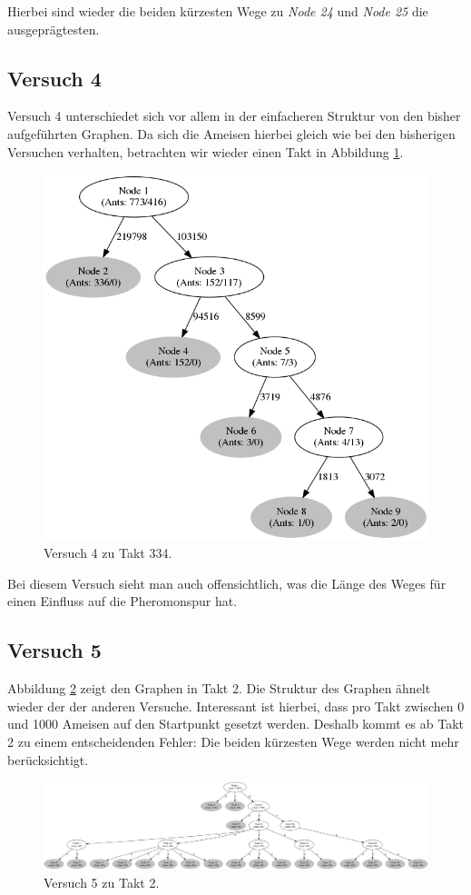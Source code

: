 Hierbei sind wieder die beiden kürzesten Wege zu \emph{Node 24} und \emph{Node 25} die ausgeprägtesten.


\subsection{Versuch 4}
Versuch 4 unterschiedet sich vor allem in der einfacheren Struktur von den bisher aufgeführten Graphen. Da sich die Ameisen hierbei gleich wie bei den bisherigen Versuchen verhalten, betrachten wir wieder einen Takt in Abbildung \ref{fig:v4_334}.

\begin{figure}[htbp]
	\includegraphics[width=.5\textwidth]{images/v4_334.png}
	\caption{Versuch 4 zu Takt 334.}
	\label{fig:v4_334}
\end{figure}

Bei diesem Versuch sieht man auch offensichtlich, was die Länge des Weges für einen Einfluss auf die Pheromonspur hat.

\subsection{Versuch 5}
Abbildung \ref{fig:v5_2} zeigt den Graphen in Takt 2. Die Struktur des Graphen ähnelt wieder der der anderen Versuche.
Interessant ist hierbei, dass pro Takt zwischen 0 und 1000 Ameisen auf den Startpunkt gesetzt werden. Deshalb kommt es ab Takt 2 zu einem entscheidenden Fehler: Die beiden kürzesten Wege werden nicht mehr berücksichtigt.

\begin{figure}[htbp]
	\includegraphics[width=\textwidth]{images/v5_2.png}
	\caption{Versuch 5 zu Takt 2.}
	\label{fig:v5_2}
\end{figure}

